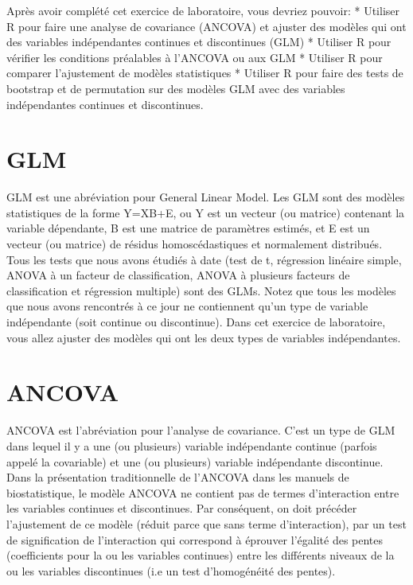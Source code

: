 \documentclass[12pt,]{book}
\begin{document}
Après avoir complété cet exercice de laboratoire, vous devriez
pouvoir:
* Utiliser R pour faire une analyse de covariance (ANCOVA) et
ajuster des modèles qui ont des variables indépendantes continues
et discontinues (GLM)
* Utiliser R pour vérifier les conditions préalables à l'ANCOVA ou
aux GLM
* Utiliser R pour comparer l'ajustement de modèles statistiques
* Utiliser R pour faire des tests de bootstrap et de permutation sur
des modèles GLM avec des variables indépendantes continues et
discontinues.

\hypertarget{glm}{%
\section{GLM}\label{glm}}

GLM est une abréviation pour General Linear Model. Les GLM sont
des modèles statistiques de la forme Y=XB+E, ou Y est un vecteur
(ou matrice) contenant la variable dépendante, B est une matrice de
paramètres estimés, et E est un vecteur (ou matrice) de résidus
homoscédastiques et normalement distribués. Tous les tests que nous
avons étudiés à date (test de t, régression linéaire simple, ANOVA à
un facteur de classification, ANOVA à plusieurs facteurs de
classification et régression multiple) sont des GLMs. Notez que tous
les modèles que nous avons rencontrés à ce jour ne contiennent qu'un
type de variable indépendante (soit continue ou discontinue). Dans cet
exercice de laboratoire, vous allez ajuster des modèles qui ont les deux
types de variables indépendantes.

\hypertarget{ancova}{%
\section{ANCOVA}\label{ancova}}

ANCOVA est l'abréviation pour l'analyse de covariance. C'est un type
de GLM dans lequel il y a une (ou plusieurs) variable indépendante
continue (parfois appelé la covariable) et une (ou plusieurs) variable
indépendante discontinue. Dans la présentation traditionnelle de
l'ANCOVA dans les manuels de biostatistique, le modèle ANCOVA
ne contient pas de termes d'interaction entre les variables continues et
discontinues. Par conséquent, on doit précéder l'ajustement de ce
modèle (réduit parce que sans terme d'interaction), par un test de
signification de l'interaction qui correspond à éprouver l'égalité des
pentes (coefficients pour la ou les variables continues) entre les
différents niveaux de la ou les variables discontinues (i.e un test
d'homogénéité des pentes).
\end{document}
